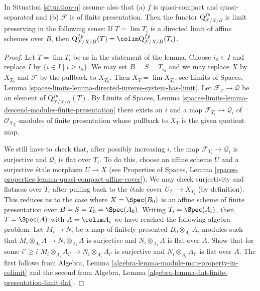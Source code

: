 \begin{lemma}
\label{lemma-q-limit-preserving}
In Situation \ref{situation-q} assume also that
(a) $f$ is quasi-compact and quasi-separated and
(b) $\mathcal{F}$ is of finite presentation.
Then the functor $\text{Q}^{fp}_{\mathcal{F}/X/B}$
is limit preserving in the following sense: If $T = \lim T_i$ is a
directed limit of affine schemes over $B$, then
$\text{Q}^{fp}_{\mathcal{F}/X/B}(T) =
\colim \text{Q}^{fp}_{\mathcal{F}/X/B}(T_i)$.
\end{lemma}

\begin{proof}
Let $T = \lim T_i$ be as in the statement of the lemma.
Choose $i_0 \in I$ and replace $I$ by $\{i \in I \mid i \geq i_0\}$.
We may set $B = S = T_{i_0}$ and we may replace $X$ by $X_{T_0}$
and $\mathcal{F}$ by the pullback to $X_{T_0}$. Then
$X_T = \lim X_{T_i}$, see
Limits of Spaces, Lemma
\ref{spaces-limits-lemma-directed-inverse-system-has-limit}.
Let $\mathcal{F}_T \to \mathcal{Q}$ be an element of
$\text{Q}^{fp}_{\mathcal{F}/X/B}(T)$. By
Limits of Spaces, Lemma
\ref{spaces-limits-lemma-descend-modules-finite-presentation}
there exists an $i$ and a map $\mathcal{F}_{T_i} \to \mathcal{Q}_i$
of $\mathcal{O}_{X_{T_i}}$-modules of finite presentation whose
pullback to $X_T$ is the given quotient map.

\medskip\noindent
We still have to check that, after possibly increasing $i$, the map
$\mathcal{F}_{T_i} \to \mathcal{Q}_i$ is surjective and $\mathcal{Q}_i$
is flat over $T_i$. To do this, choose an affine scheme $U$ and a
surjective \'etale morphism $U \to X$ (see Properties of Spaces,
Lemma \ref{spaces-properties-lemma-quasi-compact-affine-cover}).
We may check surjectivity and flatness over $T_i$ after pulling
back to the \'etale cover $U_{T_i} \to X_{T_i}$ (by definition).
This reduces us to the case where $X = \Spec(B_0)$ is an affine scheme of
finite presentation over $B = S = T_0 = \Spec(A_0)$.
Writing $T_i = \Spec(A_i)$, then $T = \Spec(A)$ with $A = \colim A_i$
we have reached the following algebra problem. Let $M_i \to N_i$
be a map of finitely presented $B_0 \otimes_{A_0} A_i$-modules
such that $M_i \otimes_{A_i} A \to N_i \otimes_{A_i} A$ is surjective
and $N_i \otimes_{A_i} A$ is flat over $A$. Show that for some $i' \geq i$
$M_i \otimes_{A_i} A_{i'} \to N_i \otimes_{A_i} A_{i'}$ is surjective
and $N_i \otimes_{A_i} A_{i'}$ is flat over $A$.
The first follows from
Algebra, Lemma \ref{algebra-lemma-module-map-property-in-colimit}
and the second from
Algebra, Lemma \ref{algebra-lemma-flat-finite-presentation-limit-flat}.
\end{proof}

